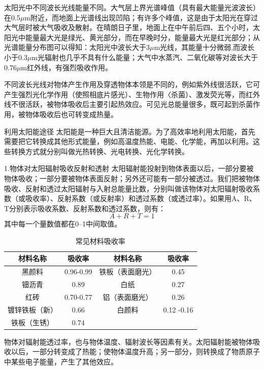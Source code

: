 \documentclass{ctexbook}
\begin{document}
太阳光中不同波长光线能量不同。大气层上界光谱峰值（具有最大能量光波波长）在0.5$\mu$m附近，而地面上光谱线出现凹陷；有许多个峰值，这是由于太阳光在穿过大气层时被大气吸收及散射。在晴朗日子里，地面上在中午前后四、五个小时，太阳光中能量最大光是绿光、黄光部分，而在早晚时分，能量最大光是红光部分；从光谱能量分布图可以得知：太阳光中波长大于3$\mu$m光线，其能量十分微弱,而波长小于0.3$\mu$m光辐射也几乎不具有什么能量；大气中水蒸汽、二氧化碳等对波长大于0.76$\mu$m红外线，有强烈吸收作用。

不同波长光线对物体产生作用及穿透物体本领是不同的，例如紫外线很活跃，它可产生强烈光化学作用（使照相底片感光）、生物作用〈杀菌）、激发荧光等，而红外线不很活跃，被物体吸收后主要引起热效应。可见光总能量很多，既可起到杀菌作用，被物体吸收后也可转变成热量。

利用太阳能途径
太阳能是一种巨大且清洁能源。为了高效率地利用太阳能，首先需要把它转换成其他形式能量，例如高温度热能、电能、化学能，再加以利用。这些转换方式就分别叫做光热转换、光电转换、光化学转换。

1.物体对太阳辐射吸收反射和透射
太阳辐射能投射到物体表面以后，一部分要被物体吸收；一部分要被物体表面反射；另外还可能有一部分被透过。我们把被物体吸收、反射和透过太阳辐射与入射总能量比数，分别叫做该物体对太阳辐射吸收系数（或吸收率）、反射系数（或反射率）和透过系数（或透过率）。如果用A、R、T分别表示吸收系数、反射系数和透过系数，则有：
\begin{equation*}
	A+R+T=1
\end{equation*}
其中每一个量数值都在0--1中间取值。

\begin{table}[htbp]
	\centering
	\caption{常见材料吸收率}
	\begin{tabular}{c|c|c|c}
		\toprule
		材料名称  & 吸收率   & 材料名称  & 吸收率 \\
		\midrule
		黑颜料   & 0.96-0.99 & 铁板（表面磨光） & 0.45 \\
		\midrule
		钿沥青   & 0.89  & 白纸    & 0.27 \\
		\midrule
		红砖    & 0.70-0.77 & 铝（表面磨光） & 0.26 \\
		\midrule
		镀锌铁板（新） & 0.66  & 白颜料   & 0.12 -0.16 \\
		\midrule
		铁板（生锈） & 0.74  &       &  \\
		\bottomrule
	\end{tabular}%
	\label{tab:xishou}%
\end{table}%


物体对辐射能透过率，也与物体温度、辐射波长等因素有关。太阳辐射能被物体吸收以后，一部分转变成了热能；使物体温度升高；另一部分，则转换成了物质原子中某些电子能量，产生了其他效应。
\end{document}
